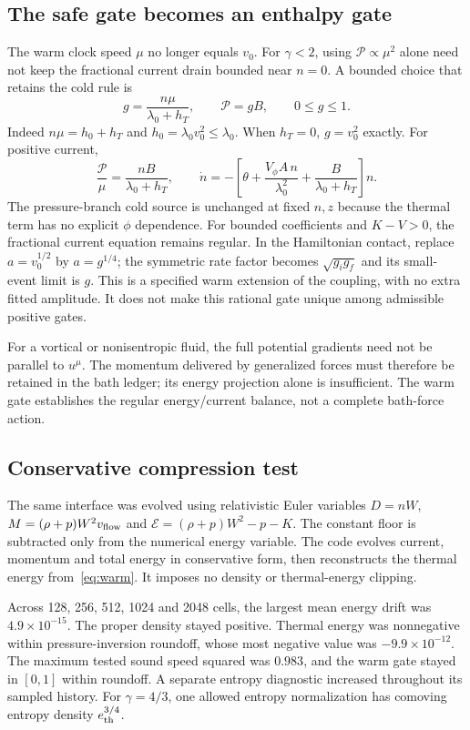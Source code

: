 \subsection{The safe gate becomes an enthalpy gate}
The warm clock speed $\mu$ no longer equals $v_0$. For $\gamma<2$,
using $\mathcal P\propto\mu^2$ alone need not keep the fractional current
drain bounded near $n=0$. A bounded choice that retains the cold rule is
\begin{equation}\label{eq:warmgate}
 g=\frac{n\mu}{\lambda_0+h_T},\qquad
 \mathcal P=gB,\qquad 0\le g\le1.
\end{equation}
Indeed $n\mu=h_0+h_T$ and $h_0=\lambda_0v_0^2\le\lambda_0$.
When $h_T=0$, $g=v_0^2$ exactly. For positive current,
\begin{equation}
 \frac{\mathcal P}{\mu}=\frac{nB}{\lambda_0+h_T},
 \qquad
 \dot n=-\left[\theta+
 \frac{V_\phi A\,n}{\lambda_0^2}+\frac{B}{\lambda_0+h_T}\right]n.
\end{equation}
The pressure-branch cold source is unchanged at fixed $n,z$ because the
thermal term has no explicit $\phi$ dependence. For bounded coefficients
and $K-V>0$, the fractional current equation remains regular. In the
Hamiltonian contact, replace $a=v_0^{1/2}$ by $a=g^{1/4}$; the symmetric
rate factor becomes $\sqrt{g_i g_f}$ and its small-event limit is $g$.
This is a specified warm extension of the coupling, with no extra fitted
amplitude. It does not make this rational gate unique among admissible
positive gates.

For a vortical or nonisentropic fluid, the full potential gradients need
not be parallel to $u^\mu$. The momentum delivered by generalized forces
must therefore be retained in the bath ledger; its energy projection
alone is insufficient. The warm gate establishes the regular energy/current
balance, not a complete bath-force action.

\subsection{Conservative compression test}
The same interface was evolved using relativistic Euler variables
$D=nW$, $M=(\rho+p)W^2v_{\rm flow}$ and
$\mathcal E=(\rho+p)W^2-p-K$.
The constant floor is subtracted only from the numerical energy variable.
The code evolves current, momentum and total energy in conservative form,
then reconstructs the thermal energy from~\eqref{eq:warm}. It imposes no
density or thermal-energy clipping.

Across 128, 256, 512, 1024 and 2048 cells, the largest mean energy drift
was $4.9\times10^{-15}$. The proper density stayed positive. Thermal
energy was nonnegative within pressure-inversion roundoff, whose most
negative value was $-9.9\times10^{-12}$. The maximum tested sound speed
squared was $0.983$, and the warm gate stayed in $[0,1]$ within roundoff.
A separate entropy diagnostic increased throughout its sampled history.
For $\gamma=4/3$, one allowed entropy normalization has comoving entropy
density $e_{\rm th}^{3/4}$.


